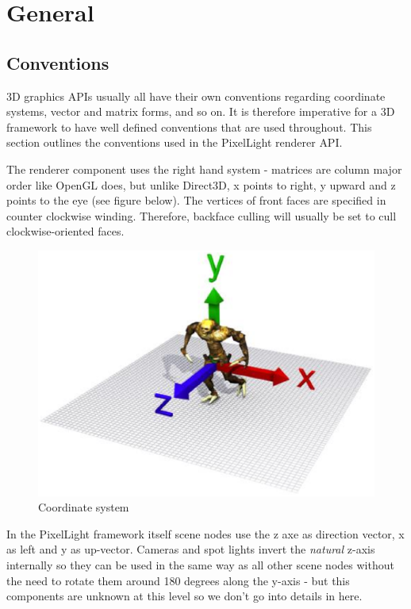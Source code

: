 \section{General}




\subsection{Conventions}
3D graphics \ac{API}s usually all have their own conventions regarding coordinate systems, vector and matrix forms, and so on. It is therefore imperative for a 3D framework to have well defined conventions that are used throughout. This section outlines the conventions used in the PixelLight renderer \ac{API}.

The renderer component uses the right hand system - matrices are column major order like \ac{OpenGL} does, but unlike Direct3D, x points to right, y upward and z points to the eye (see figure below). The vertices of front faces are specified in counter clockwise winding. Therefore, backface culling will usually be set to cull clockwise-oriented faces.

\begin{figure}
  \centering
  \includegraphics[scale=0.7]{pics/CoordinateSystem.eps}
  \caption{Coordinate system}
  \label{fig:Coordinate system}
\end{figure}

In the PixelLight framework itself scene nodes use the z axe as direction vector, x as left and y as up-vector. Cameras and spot lights invert the \emph{natural} z-axis internally so they can be used in the same way as all other scene nodes without the need to rotate them around 180 degrees along the y-axis - but this components are unknown at this level so we don't go into details in here.




